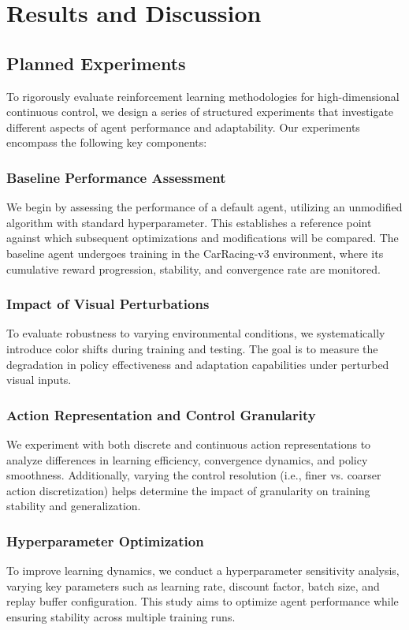 \documentclass[../CSC_52081_EP.tex]{subfiles}
\begin{document}
\section{Results and Discussion}

\subsection{Planned Experiments}
To rigorously evaluate reinforcement learning methodologies for high-dimensional continuous control, we design a series of structured experiments that investigate different aspects of agent performance and adaptability. Our experiments encompass the following key components:

\subsubsection{Baseline Performance Assessment}
We begin by assessing the performance of a default agent, utilizing an unmodified algorithm with standard hyperparameter. This establishes a reference point against which subsequent optimizations and modifications will be compared. The baseline agent undergoes training in the CarRacing-v3 environment, where its cumulative reward progression, stability, and convergence rate are monitored.

\subsubsection{Impact of Visual Perturbations}
To evaluate robustness to varying environmental conditions, we systematically introduce color shifts during training and testing. The goal is to measure the degradation in policy effectiveness and adaptation capabilities under perturbed visual inputs.

\subsubsection{Action Representation and Control Granularity}
We experiment with both discrete and continuous action representations to analyze differences in learning efficiency, convergence dynamics, and policy smoothness. Additionally, varying the control resolution (i.e., finer vs. coarser action discretization) helps determine the impact of granularity on training stability and generalization.

\subsubsection{Hyperparameter Optimization}
To improve learning dynamics, we conduct a hyperparameter sensitivity analysis, varying key parameters such as learning rate, discount factor, batch size, and replay buffer configuration. This study aims to optimize agent performance while ensuring stability across multiple training runs.
\end{document}
